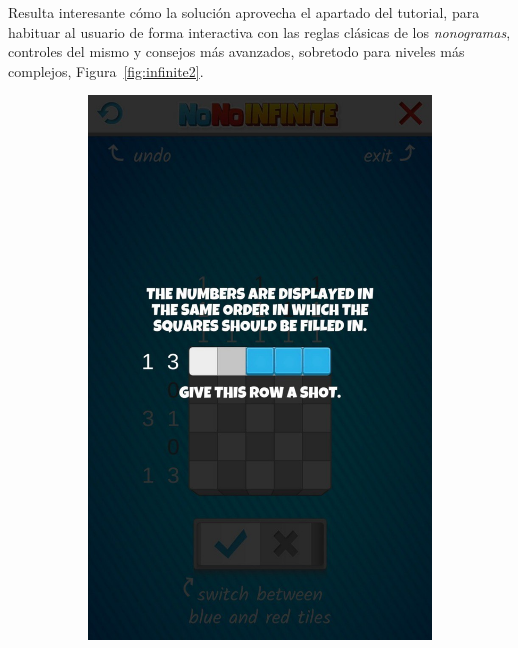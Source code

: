 Resulta interesante cómo la solución aprovecha el apartado del tutorial, para habituar al usuario de forma interactiva con las reglas clásicas de los 
\textit{nonogramas}, controles del mismo y consejos más avanzados, sobretodo para niveles más complejos, Figura~\ref{fig:infinite2}.

\begin{figure}[H]
   \centering
   \begin{subfigure}[b]{0.4\linewidth}
     \includegraphics[width=\linewidth]{images/infinite3.jpg}
   \end{subfigure}
   \begin{subfigure}[b]{0.4\linewidth}

\end{subfigure}
\end{figure}
